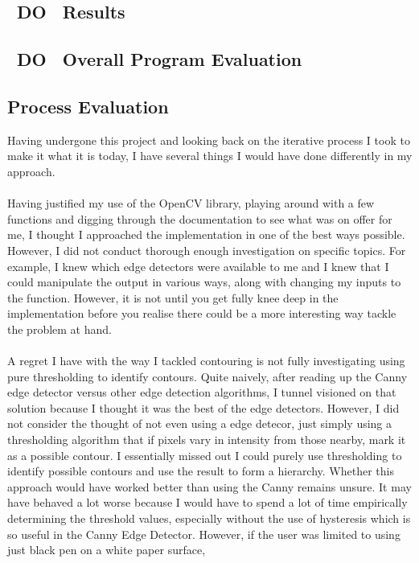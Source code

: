 \documentclass[11pt]{article}
\begin{document}
\subsection{~DO~ Results}

\subsection{~DO~ Overall Program Evaluation}

\subsection{Process Evaluation}
Having undergone this project and looking back on the iterative process
I took to make it what it is today, I have several things I would have
done differently in my approach.\\
\\
Having justified my use of the OpenCV library, playing around with a 
few functions and digging through the documentation to see what was
on offer for me, I thought I approached the implementation in one of the
best ways possible. However, I did not conduct thorough enough investigation
on specific topics. For example, I knew which edge detectors were available to
me and I knew that I could manipulate the output in various ways, along with
changing my inputs to the function. However, it is not until you get
fully knee deep in the implementation before you realise there could
be a more interesting way tackle the problem at hand.\\
\\
A regret I have with the way I tackled contouring is not fully investigating
using pure thresholding to identify contours. Quite naively, after reading
up the Canny edge detector versus other edge detection algorithms, I tunnel
visioned on that solution because I thought it was the best of the edge 
detectors. However, I did not consider the thought of not even using
a edge detecor, just simply using a thresholding algorithm that if pixels 
vary in intensity from those nearby, mark it as a possible contour. I
essentially missed out I could purely use thresholding to identify possible
contours and use the result to form a hierarchy. Whether this approach
would have worked better than using the Canny remains unsure. It may
have behaved a lot worse because I would have to spend a lot of time 
empirically determining the threshold values, especially without the 
use of hysteresis which is so useful in the Canny Edge Detector. However, if
the user was limited to using just black pen on a white paper surface,
\end{document}
